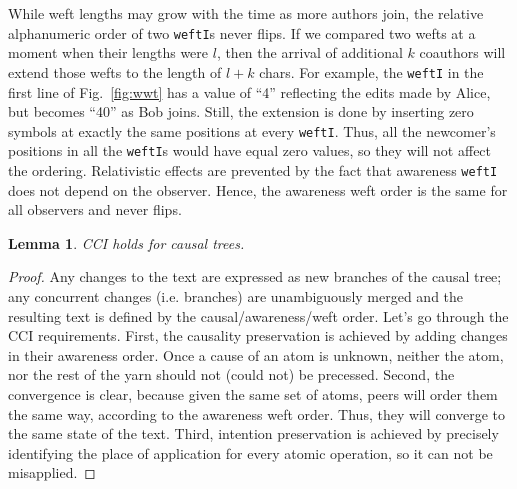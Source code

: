 \documentclass{sig-alternate}
\newtheorem{lemma}{Lemma}
\begin{document}
While weft lengths may grow with the time as more authors join, the relative alphanumeric order of two {\tt weftI}s never flips.
If we compared two wefts at a moment when their lengths were $l$, then the arrival of additional $k$ coauthors will extend those wefts to the length of $l+k$ chars.
For example, the {\tt weftI} in the first line of Fig.~\ref{fig:wwt} has a value of ``4'' reflecting the edits made by Alice, but becomes ``40'' as Bob joins.
Still, the extension is done by inserting zero symbols at exactly the same positions at every {\tt weftI}. %
Thus, all the newcomer's positions in all the {\tt weftI}s would have equal zero values, so they will not affect the ordering.
Relativistic effects are prevented by the fact that awareness {\tt weftI} does not depend on the observer.
Hence, the awareness weft order is the same for all observers and never flips.

\begin{lemma}
CCI holds for causal trees. 
\end{lemma}
\begin{proof}
Any changes to the text are expressed as new branches  of the causal tree; any concurrent changes (i.e. branches) are unambiguously merged and the resulting text is defined by the causal/awareness/weft order.
Let's go through the CCI requirements.
First, the causality preservation is achieved by adding changes in their awareness order. Once a cause of an atom is unknown, neither the atom, nor the rest of the yarn should not (could not) be precessed.
Second, the convergence is clear, because given the same set of atoms, peers will order them the same way, according to the awareness weft order. Thus, they will converge to the same state of the text.
Third, intention preservation is achieved by precisely identifying the place of application for every atomic operation, so it can not be misapplied.
\end{proof}
\end{document}
